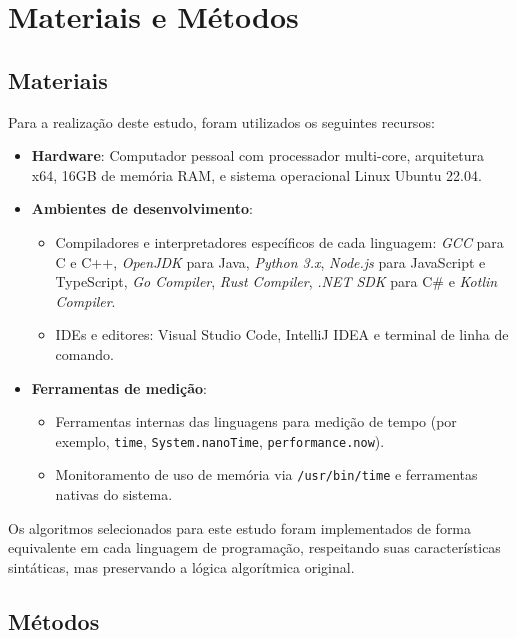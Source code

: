 \documentclass[12pt,oneside,a4paper]{report}
\begin{document}

\chapter{Materiais e Métodos}

\section{Materiais}

Para a realização deste estudo, foram utilizados os seguintes recursos:

\begin{itemize}
    \item \textbf{Hardware}: Computador pessoal com processador multi-core, arquitetura x64, 16GB de memória RAM, e sistema operacional Linux Ubuntu 22.04.
    \item \textbf{Ambientes de desenvolvimento}: 
    \begin{itemize}
        \item Compiladores e interpretadores específicos de cada linguagem: \textit{GCC} para C e C++, \textit{OpenJDK} para Java, \textit{Python 3.x}, \textit{Node.js} para JavaScript e TypeScript, \textit{Go Compiler}, \textit{Rust Compiler}, \textit{.NET SDK} para C\# e \textit{Kotlin Compiler}.
        \item IDEs e editores: Visual Studio Code, IntelliJ IDEA e terminal de linha de comando.
    \end{itemize}
    \item \textbf{Ferramentas de medição}: 
    \begin{itemize}
        \item Ferramentas internas das linguagens para medição de tempo (por exemplo, \texttt{time}, \texttt{System.nanoTime}, \texttt{performance.now}).
        \item Monitoramento de uso de memória via \texttt{/usr/bin/time} e ferramentas nativas do sistema.
    \end{itemize}
\end{itemize}

Os algoritmos selecionados para este estudo foram implementados de forma equivalente em cada linguagem de programação, respeitando suas características sintáticas, mas preservando a lógica algorítmica original.

\section{Métodos}
\end{document}
